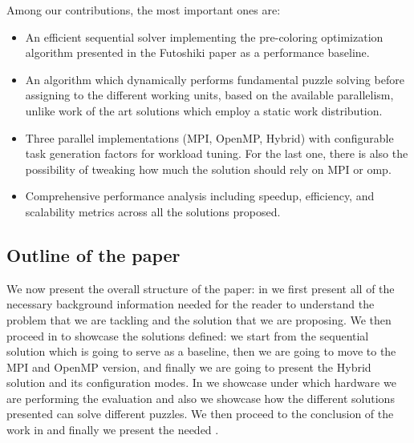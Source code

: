 Among our contributions, the most important ones are:
\begin{itemize}
    \item An efficient sequential solver implementing the pre-coloring optimization algorithm presented in the Futoshiki paper as a performance baseline.
    \item An algorithm which dynamically performs fundamental puzzle solving before assigning to the different working units, based on the available parallelism, unlike work of the art solutions which employ a static work distribution.
    \item Three parallel implementations (MPI, OpenMP, Hybrid) with configurable task generation factors for workload tuning. For the last one, there is also the possibility of tweaking how much the solution should rely on MPI or omp.
    \item Comprehensive performance analysis including speedup, efficiency, and scalability metrics across all the solutions proposed.
\end{itemize}


\subsection{Outline of the paper}
We now present the overall structure of the paper: in  we first present all of the necessary background information needed for the reader to understand the problem that we are tackling and the solution that we are proposing. We then proceed in  to showcase the solutions defined: we start from the sequential solution which is going to serve as a baseline, then we are going to move to the MPI and OpenMP version, and finally we are going to present the Hybrid solution and its configuration modes. In  we showcase under which hardware we are performing the evaluation and also we showcase how the different solutions presented can solve different puzzles. We then proceed to the conclusion of the work in  and finally we present the needed .